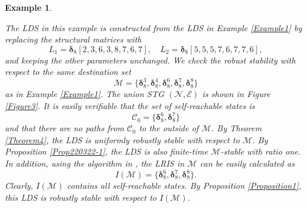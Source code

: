 \documentclass[11pt,onecolumn]{article}
\newtheorem{example}{Example}
\newcommand{\ddelta}{{\boldsymbol\delta}}
\begin{document}
\begin{example}\label{Example2}

 The LDS in this example is constructed from the LDS in Example \ref{Example1} by replacing the structural matrices with
  \[L_1=\ddelta_8[2,3,6,3,8,7,6,7],\quad L_2=\ddelta_8[5,5,5,7,6,7,7,6],\]
 and keeping the other parameters unchanged.
 We check the robust stability with respect to the same destination set
         \[\mathcal M=\{\ddelta_8^3,\ddelta_8^4,\ddelta_8^6,\ddelta_8^7,\ddelta_8^8\}\]
 as in Example \ref{Example1}. The union STG $(\mathcal N,\mathcal E)$ is shown in Figure \ref{Figure3}. It is easily verifiable that the set of self-reachable states is
 \[\mathcal C_0=\{\ddelta_8^6,\ddelta_8^7\}\]
 and that there are no paths from $\mathcal C_0$ to the outside of $\mathcal M$. By Theorem \ref{Theorem4}, the LDS is uniformly robustly stable with respect to $\mathcal M$. By Proposition \ref{Prop220322-1}, the LDS is also finite-time $\mathcal M$-stable with ratio one. In addition, using the algorithm in \cite{Guo2017Invariant}, the LRIS in $\mathcal M$ can be easily calculated as
 \[I(\mathcal M)=\{\ddelta_8^6,\ddelta_8^7,\ddelta_8^8\}.\]
 Clearly, $I(\mathcal M)$ contains all self-reachable states. By Proposition \ref{Proposition1}, this LDS is robustly stable with respect to $I(\mathcal M)$.


 \begin{figure}[t]
    \centering



\end{figure}
\end{example}
\end{document}

